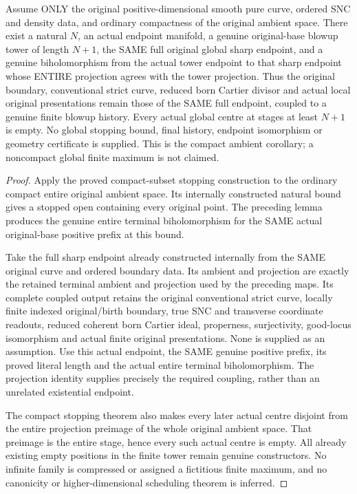 \begin{theorem}
\label{hir:sharp-actual-curve-compact-global-finite-sharp-endpoint}
\leanok
Assume ONLY the original positive-dimensional smooth pure curve, ordered
SNC and density data, and ordinary compactness of the original ambient
space. There exist a natural $N$, an actual endpoint manifold, a genuine
original-base blowup tower of length $N+1$, the SAME full original global
sharp endpoint, and a genuine biholomorphism from the actual tower endpoint
to that sharp endpoint whose ENTIRE projection agrees with the tower
projection. Thus the original boundary, conventional strict curve, reduced
born Cartier divisor and actual local original presentations remain those
of the SAME full endpoint, coupled to a genuine finite blowup history.
Every actual global centre at stages at least $N+1$ is empty. No global
stopping bound, final history, endpoint isomorphism or geometry certificate
is supplied. This is the compact ambient corollary; a noncompact global
finite maximum is not claimed.
\end{theorem}
\begin{proof}
Apply the proved compact-subset stopping construction to the ordinary
compact entire original ambient space. Its internally constructed natural
bound gives a stopped open containing every original point. The preceding
lemma produces the genuine entire terminal biholomorphism for the SAME
actual original-base positive prefix at this bound.

Take the full sharp endpoint already constructed internally from the SAME
original curve and ordered boundary data. Its ambient and projection are
exactly the retained terminal ambient and projection used by the preceding
maps. Its complete coupled output retains the original conventional strict
curve, locally finite indexed original/birth boundary, true SNC and
transverse coordinate readouts, reduced coherent born Cartier ideal,
properness, surjectivity, good-locus isomorphism and actual finite original
presentations. None is supplied as an assumption. Use this actual endpoint,
the SAME genuine positive prefix, its proved literal length and the actual
entire terminal biholomorphism. The projection identity supplies precisely
the required coupling, rather than an unrelated existential endpoint.

The compact stopping theorem also makes every later actual centre disjoint
from the entire projection preimage of the whole original ambient space.
That preimage is the entire stage, hence every such actual centre is empty.
All already existing empty positions in the finite tower remain genuine
constructors. No infinite family is compressed or assigned a fictitious
finite maximum, and no canonicity or higher-dimensional scheduling theorem
is inferred.
\end{proof}
